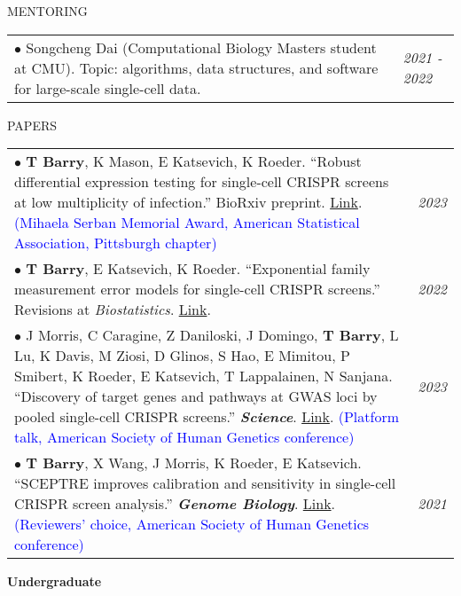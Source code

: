\documentclass{resume} %
\begin{document}


\begin{rSection}{MENTORING}
	\begin{tabular}{p{14cm}R{2.5cm}}
		$\bullet$ Songcheng Dai (Computational Biology Masters student at CMU). Topic: algorithms, data structures, and software for large-scale single-cell data.
		& \textit{2021 - 2022} \\ 
	\end{tabular} 
\end{rSection}
 
\begin{rSection}{PAPERS}

\begin{tabular}{p{14cm}R{2.5cm}}
	$\bullet$ \textbf{T Barry}, K Mason, E Katsevich, K Roeder. ``Robust differential expression testing for single-cell CRISPR screens at low multiplicity of infection.'' BioRxiv preprint. \href{https://www.biorxiv.org/content/10.1101/2023.05.15.540875v1}{Link}. \textcolor{blue}{(Mihaela Serban Memorial Award, American Statistical Association, Pittsburgh chapter)}  & \textit{2023} \\
	$\bullet$ \textbf{T Barry}, E Katsevich, K Roeder. ``Exponential family measurement error models for single-cell CRISPR screens.'' Revisions at \textit{Biostatistics}. \href{https://arxiv.org/abs/2201.01879}{Link}. & \textit{2022} \\
	 $\bullet$ J Morris, C Caragine, Z Daniloski, J Domingo, \textbf{T Barry}, L Lu, K Davis, M Ziosi, D Glinos, S Hao, E Mimitou, P Smibert, K Roeder, E Katsevich, T Lappalainen, N Sanjana. ``Discovery of target genes and pathways at GWAS loci by pooled single-cell CRISPR screens.'' \textit{\textbf{Science}}.  \href{https://www.science.org/doi/10.1126/science.adh7699}{Link}. \textcolor{blue}{(Platform talk, American Society of Human Genetics conference)}  & \textit{2023} \\
	$\bullet$ \textbf{T Barry}, X Wang, J Morris, K Roeder, E Katsevich. ``SCEPTRE improves calibration and sensitivity in single-cell CRISPR screen analysis.'' \textit{\textbf{Genome Biology}}. \href{https://genomebiology.biomedcentral.com/articles/10.1186/s13059-021-02545-2}{Link}. \textcolor{blue}{(Reviewers’ choice, American Society of Human Genetics conference)} 
	& \textit{2021}  
	\\
\end{tabular} 

\textbf{Undergraduate}


\end{rSection}
\end{document}
